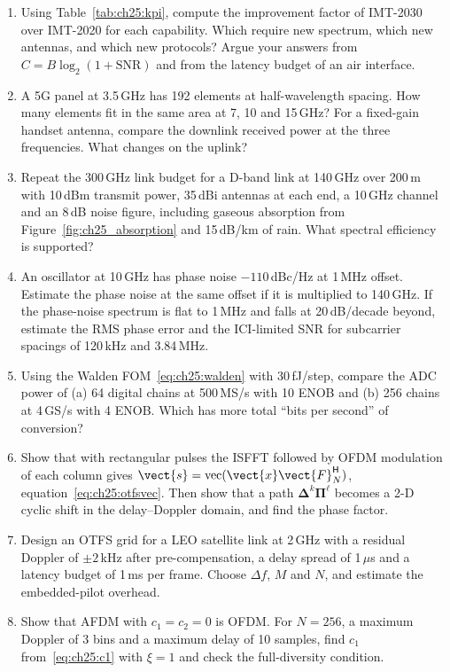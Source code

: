 \problems
\begin{enumerate}[label=\thechapter.\arabic*]
\item Using Table~\ref{tab:ch25:kpi}, compute the improvement factor of IMT-2030 over IMT-2020 for each
capability. Which require new spectrum, which new antennas, and which new protocols? Argue your answers
from $C=B\log_2(1+\mathrm{SNR})$ and from the latency budget of an air interface.
\item A 5G panel at 3.5\,GHz has 192 elements at half-wavelength spacing. How many elements fit in the
same area at 7, 10 and 15\,GHz? For a fixed-gain handset antenna, compare the downlink received power
at the three frequencies. What changes on the uplink?
\item Repeat the 300\,GHz link budget for a D-band link at 140\,GHz over 200\,m with 10\,dBm transmit power,
35\,dBi antennas at each end, a 10\,GHz channel and an 8\,dB noise figure, including gaseous absorption
from Figure~\ref{fig:ch25_absorption} and 15\,dB/km of rain. What spectral efficiency is supported?
\item An oscillator at 10\,GHz has phase noise $-110$\,dBc/Hz at 1\,MHz offset. Estimate the phase noise
at the same offset if it is multiplied to 140\,GHz. If the phase-noise spectrum is flat to 1\,MHz and
falls at 20\,dB/decade beyond, estimate the RMS phase error and the ICI-limited SNR for subcarrier
spacings of 120\,kHz and 3.84\,MHz.
\item Using the Walden FOM~\eqref{eq:ch25:walden} with 30\,fJ/step, compare the ADC power of (a) 64
digital chains at 500\,MS/s with 10 ENOB and (b) 256 chains at 4\,GS/s with 4 ENOB. Which has more
total ``bits per second'' of conversion?
\item Show that with rectangular pulses the ISFFT followed by OFDM modulation of each column gives
$\vect{s}=\operatorname{vec}(\vect{x}\vect{F}_N^{\mathsf H})$, equation~\eqref{eq:ch25:otfsvec}. Then
show that a path $\bm{\Delta}^k\bm{\Pi}^\ell$ becomes a 2-D cyclic shift in the delay--Doppler
domain, and find the phase factor.
\item Design an OTFS grid for a LEO satellite link at 2\,GHz with a residual Doppler of $\pm2$\,kHz after
pre-compensation, a delay spread of 1\,$\mu$s and a latency budget of 1\,ms per frame. Choose
$\Delta f$, $M$ and $N$, and estimate the embedded-pilot overhead.
\item Show that AFDM with $c_1=c_2=0$ is OFDM. For $N=256$, a maximum Doppler of 3 bins and a maximum delay
of 10 samples, find $c_1$ from~\eqref{eq:ch25:c1} with $\xi=1$ and check the full-diversity condition.

\end{enumerate}
